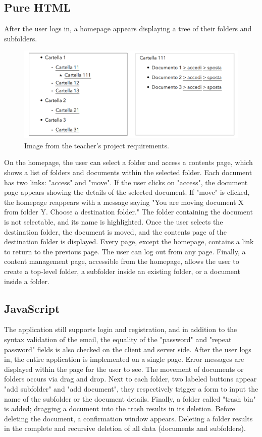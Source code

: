 \documentclass[a4paper,12pt]{article}
\begin{document}
\subsection{Pure HTML}
After the user logs in, a homepage appears displaying a tree of their folders and subfolders.
\begin{figure}[h]
    \centering
    \includegraphics[width=1.0\textwidth]{HTML/HTMLTree.png}
    \caption{Image from the teacher's project requirements.}
    \label{fig:ERDiagram}
\end{figure}
On the homepage, the user can select a folder and access a contents page, which shows a list of folders and documents within the selected folder. Each document has two links: "access" and "move". If the user clicks on "access", the document page appears showing the details of the selected document. If "move" is clicked, the homepage reappears with a message saying "You are moving document X from folder Y. Choose a destination folder." The folder containing the document is not selectable, and its name is highlighted. Once the user selects the destination folder, the document is moved, and the contents page of the destination folder is displayed. Every page, except the homepage, contains a link to return to the previous page. The user can log out from any page. Finally, a content management page, accessible from the homepage, allows the user to create a top-level folder, a subfolder inside an existing folder, or a document inside a folder.

\newpage
\subsection{JavaScript}
The application still supports login and registration, and in addition to the syntax validation of the email, the equality of the "password" and "repeat password" fields is also checked on the client and server side. After the user logs in, the entire application is implemented on a single page. Error messages are displayed within the page for the user to see. The movement of documents or folders occurs via drag and drop. Next to each folder, two labeled buttons appear "add subfolder" and "add document", they respectively trigger a form to input the name of the subfolder or the document details. Finally, a folder called "trash bin" is added; dragging a document into the trash results in its deletion. Before deleting the document, a confirmation window appears. Deleting a folder results in the complete and recursive deletion of all data (documents and subfolders).
\end{document}
